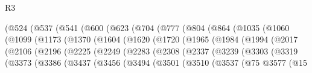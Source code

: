 \begin{lexlean}{R3}
\begin{coremodule}
                (@524
                  (@537
                    (@541
                      (@600
                        (@623
                          (@704
                            (@777
                              (@804
                                (@864
                                  (@1035
                                    (@1060
                                      (@1099
                                        (@1173
                                          (@1370
                                            (@1604
                                              (@1620
                                                (@1720
                                                  (@1965
                                                    (@1984
                                                      (@1994
                                                        (@2017
                                                          (@2106
                                                            (@2196
                                                              (@2225
                                                                (@2249
                                                                  (@2283
                                                                    (@2308
                                                                      (@2337
                                                                        (@3239
                                                                          (@3303
                                                                            (@3319
                                                                              (@3373
                                                                                (@3386
                                                                                  (@3437
                                                                                    (@3456
                                                                                      (@3494
                                                                                        (@3501
                                                                                          (@3510
                                                                                            (@3537
                                                                                              (@75
                                                                                                @3577
                                                                                                (@15

\end{coremodule}
\end{lexlean}
